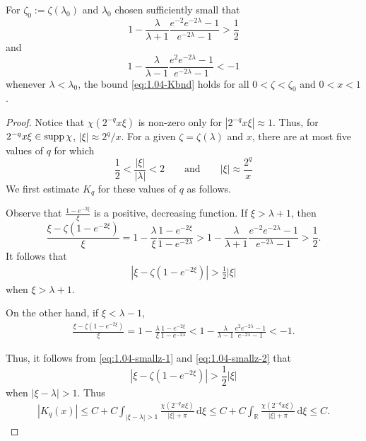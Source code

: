 \documentclass[../dissertation.tex]{subfiles}
\begin{document}
\begin{lma}%
	\label{lma:1.04-smallz}
	For $\zeta_0 := \zeta(\lambda_0)$ and $\lambda_0$ chosen sufficiently small that
	\[
		1 - \frac{\lambda}{\lambda+1}\frac{e^{-2}e^{-2\lambda}-1}{e^{-2\lambda}-1} 
			> \frac{1}{2}
	\]
	and
	\[
		1 - \frac{\lambda}{\lambda - 1} \frac{e^2 e^{-2\lambda} -1}{e^{-2\lambda}-1}
			<-1
	\]
	whenever $\lambda < \lambda_0$, the bound \eqref{eq:1.04-Kbnd} holds
	for all $0 < \zeta < \zeta_0$ and $0 < x < 1$. 
\end{lma}
\begin{proof}
	Notice that $\chi\left( 2^{-q} x \xi\right)$ is non-zero only for 
	$\left|2^{-q} x \xi\right| \approx 1$. Thus, for $2^{-q} x \xi \in \operatorname{supp} \chi$,
	$|\xi| \approx 2^{q}/x$. For a given $\zeta = \zeta(\lambda)$ and $x$, there are at most
	five values of $q$ for which 
	\[
		\frac{1}{2} < \frac{|\xi|}{|\lambda|} < 2 
		\qquad \text{and} \qquad |\xi| \approx \frac{2^{q}}{x}
	\]
	We first estimate $K_q$ for these values of $q$ as follows. 

	Observe that $\displaystyle \frac{1-e^{-2\xi}}{\xi}$ is a positive, decreasing function.
	If $\xi > \lambda +1$, then
	\[
		\frac{\xi - \zeta\left(1-e^{-2\xi}\right)}{\xi}
			= 1 - \frac{\lambda}{\xi} \frac{1 - e^{-2\xi}}{1- e^{-2\lambda}} 
			> 1 - \frac{\lambda}{\lambda+1}\frac{e^{-2}e^{-2\lambda}-1}{e^{-2\lambda}-1} 
			> \frac{1}{2}.
	\]
	It follows that 
	\begin{align} \label{eq:1.04-smallz-1}
		\left| \xi - \zeta\left(1 - e^{-2\xi}\right) \right| > \frac{1}{2}|\xi|
	\end{align}
	when $\xi > \lambda +1$. 

	On the other hand, if $\xi < \lambda -1$, 
	\begin{align} \label{eq:1.04-smallz-2}
		\frac{\xi - \zeta\left(1-e^{-2\xi}\right)}{\xi}
			= 1 - \frac{\lambda}{\xi} \frac{1 - e^{-2\xi}}{1- e^{-2\lambda}} 
			< 1 - \frac{\lambda}{\lambda - 1} \frac{e^2 e^{-2\lambda} -1}{e^{-2\lambda}-1}
			<-1.
	\end{align}
	
	Thus, it follows from \eqref{eq:1.04-smallz-1} and \eqref{eq:1.04-smallz-2} that
	\[
		\left| \xi - \zeta\left(1 - e^{-2\xi}\right) \right| > \frac{1}{2}|\xi|
	\]
	when $|\xi - \lambda| > 1$. Thus
	\begin{align}
		\left| K_q(x) \right|
			\leq C + C 
				\int_{|\xi - \lambda| > 1} 
					\frac{\chi(2^{-q} x \xi)}{|\xi| + \pi} 
				\, \mathrm{d}\xi
			\leq C + C 
				\int_{\mathbb R} 
					\frac{\chi(2^{-q} x \xi)}{|\xi| + \pi}
				\, \mathrm{d}\xi
			\leq C.
	\end{align}


\end{proof}
\end{document}
